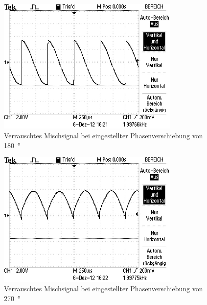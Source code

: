 \begin{figure}
  \centering
  \includegraphics[width=0.8\textwidth]{aufnahmen/phase_180_verrauscht.jpg}
  \caption{Verrauschtes Mischsignal bei eingestellter Phasenverschiebung
    von \SI{180}{\degree}}
  \label{fig:phase_180_verrauscht}
\end{figure}

\begin{figure}
  \centering
  \includegraphics[width=0.8\textwidth]{aufnahmen/phase_270_verrauscht.jpg}
  \caption{Verrauschtes Mischsignal bei eingestellter Phasenverschiebung
    von \SI{270}{\degree}}
  \label{fig:phase_270_verrauscht}
\end{figure}
